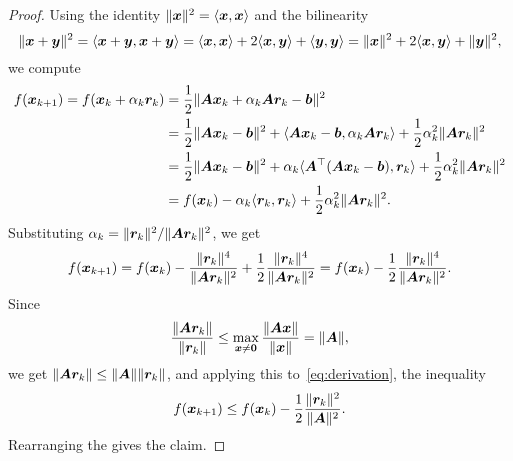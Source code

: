 \begin{proof} Using the identity $\Vert {\bm{x}}\Vert^2=\langle {\bm{x}}, {\bm{x}} \rangle$ and the bilinearity
 \begin{equation*}
  \Vert {\bm{x}+\bm{y}}\Vert^2=\langle {\bm{x}+\bm{y}}, {\bm{x}+\bm{y}} \rangle=\langle {\bm{x}}, {\bm{x}} \rangle+2\langle {\bm{x}}, {\bm{y}} \rangle+\langle {\bm{y}}, {\bm{y}} \rangle = \Vert {\bm{x}}\Vert^2+2\langle {\bm{x}}, {\bm{y}} \rangle+\Vert {\bm{y}}\Vert^2,
 \end{equation*}
we compute
 \begin{align}\label{eq:derivation}
 \begin{split}
  f(\bm{x}_{k+1})=f(\bm{x}_k+\alpha_k\bm{r}_k) &= \frac{1}{2}\Vert {\bm{A}\bm{x}_k+\alpha_k\bm{A}\bm{r}_k-\bm{b}}\Vert^2\\
 &= \frac{1}{2}\Vert {\bm{A}\bm{x}_k-\bm{b}}\Vert^2+\langle {\bm{A}\bm{x}_k-\bm{b}}, {\alpha_k \bm{A}\bm{r}_k} \rangle+\frac{1}{2}\alpha_k^2\Vert {\bm{A}\bm{r}_k}\Vert^2\\
 &=\frac{1}{2}\Vert {\bm{A}\bm{x}_k-\bm{b}}\Vert^2+\alpha_k\langle {\bm{A}^{\top}(\bm{A}\bm{x}_k-\bm{b})}, {\bm{r}_k} \rangle+\frac{1}{2}\alpha_k^2\Vert {\bm{A}\bm{r}_k}\Vert^2\\
&= f(\bm{x}_k)-\alpha_k \langle {\bm{r}_k}, {\bm{r}_k} \rangle+\frac{1}{2}\alpha_k^2\Vert {\bm{A}\bm{r}_k}\Vert^2.
  \end{split}
  \end{align}
Substituting $\alpha_k=\Vert {\bm{r}_k}\Vert^2/\Vert {\bm{A}\bm{r}_k}\Vert^2$, we get
\begin{equation*}
 f(\bm{x}_{k+1}) = f(\bm{x}_k) -\frac{\Vert {\bm{r}_k}\Vert^4}{\Vert {\bm{A}\bm{r}_k}\Vert^2}+\frac{1}{2}\frac{\Vert {\bm{r}_k}\Vert^4}{\Vert {\bm{A}\bm{r}_k}\Vert^2} = f(\bm{x}_k)-\frac{1}{2}\frac{\Vert {\bm{r}_k}\Vert^4}{\Vert {\bm{A}\bm{r}_k}\Vert^2}.
\end{equation*}
Since 
\begin{equation*}
 \frac{\Vert {\bm{A}\bm{r}_k}\Vert}{\Vert {\bm{r}_k}\Vert} \leq \max_{\bm{x}\neq \bm{0}} \frac{\Vert {\bm{A}\bm{x}}\Vert}{\Vert {\bm{x}}\Vert} = \Vert {\bm{A}}\Vert,
\end{equation*}
we get $\Vert {\bm{A}\bm{r}_k}\Vert\leq \Vert {\bm{A}}\Vert\Vert {\bm{r}_k}\Vert$, and applying this to~\eqref{eq:derivation}, the inequality
\begin{equation*}
 f(\bm{x}_{k+1}) \leq f(\bm{x}_k) - \frac{1}{2}\frac{\Vert {\bm{r}_k}\Vert^2}{\Vert {\bm{A}}\Vert^2}.
\end{equation*}
Rearranging the gives the claim.
\end{proof}

